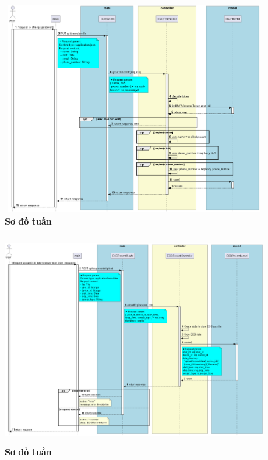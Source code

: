 \documentclass{article}%
\begin{document}
\begin{figure}[H]
  \centering
  \includegraphics[width=16cm,height=9cm]{Images/server/sequence/server/updateUserInfo.png}
  \caption[Sơ đồ tuần tự ]{\bfseries \fontsize{12pt}{0pt}
  \selectfont Sơ đồ tuần }
  \label{hinh21} %
\end{figure}



\begin{figure}[H]
  \centering
  \includegraphics[width=16cm,height=9cm]{Images/server/sequence/server/uploadEcgData.png}
  \caption[Sơ đồ tuần tự ]{\bfseries \fontsize{12pt}{0pt}
  \selectfont Sơ đồ tuần }
  \label{hinh21} %
\end{figure}
\end{document}
